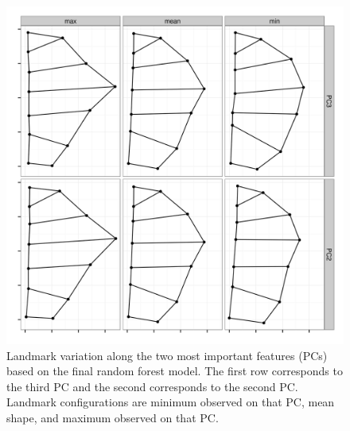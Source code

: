 \documentclass[12pt,letterpaper]{article}\usepackage{graphicx, color}
\begin{document}
\begin{figure}[ht]
  \centering
  \includegraphics[width = \textwidth]{figure/imp_var}
  \caption{Landmark variation along the two most important features (PCs) based on the final random forest model. The first row corresponds to the third PC and the second corresponds to the second PC. Landmark configurations are minimum observed on that PC, mean shape, and maximum observed on that PC.}
  \label{fig:imp_var}
\end{figure}
\end{document}
